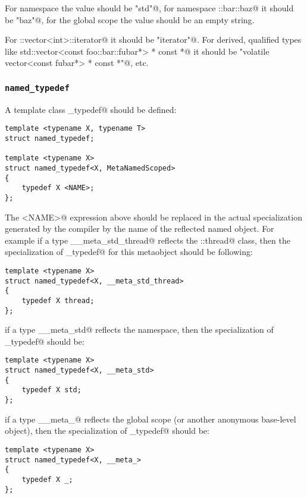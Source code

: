 For namespace \verb@std@ the value should be \verb@"std"@, for namespace
\verb@foo::bar::baz@ it should be \verb@"baz"@, for the global scope the
value should be an empty string.

For \verb@std::vector<int>::iterator@ it should be \verb@"iterator"@. For derived,
qualified types like \verb@volatile std::vector<const foo::bar::fubar*> * const *@
it should be \verb@"volatile vector<const fubar*> * const *"@, etc.


\subsubsection{\texttt{named\_typedef}}

A template class \verb@named_typedef@ should be defined:

\begin{lstlisting}
template <typename X, typename T>
struct named_typedef;

template <typename X>
struct named_typedef<X, MetaNamedScoped>
{
	typedef X <NAME>;
};
\end{lstlisting}

The \verb@<NAME>@ expression above should be replaced in the actual specialization generated by the compiler
by the name of the reflected named object. For example if a type \verb@__meta_std_thread@
reflects the \verb@std::thread@ class, then the specialization of \verb@named_typedef@
for this metaobject should be following:

\begin{lstlisting}
template <typename X>
struct named_typedef<X, __meta_std_thread>
{
	typedef X thread;
};
\end{lstlisting}

if a type \verb@__meta_std@ reflects the \verb@std@ namespace, then the specialization of \verb@named_typedef@
should be:

\begin{lstlisting}
template <typename X>
struct named_typedef<X, __meta_std>
{
	typedef X std;
};
\end{lstlisting}

if a type \verb@__meta_@ reflects the global scope (or another anonymous base-level object),
then the specialization of \verb@named_typedef@ should be:

\begin{lstlisting}
template <typename X>
struct named_typedef<X, __meta_>
{
	typedef X _;
};
\end{lstlisting}

